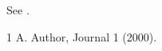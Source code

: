 \documentclass{article}
\begin{document}
See \cite{a}.
\mciteErrorOnUnknownfalse
\begin{mcitethebibliography}{1}
 A. Author, Journal 1 (2000).
\end{mcitethebibliography}
\end{document}
